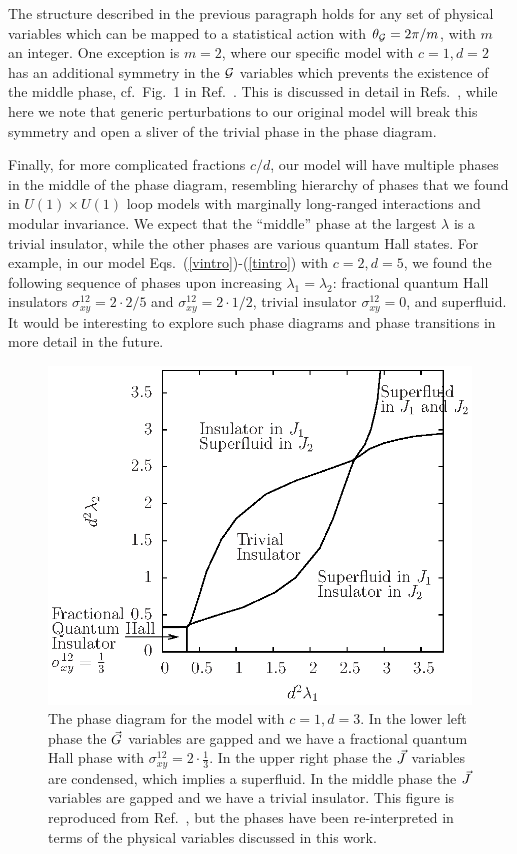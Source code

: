 The structure described in the previous paragraph holds for any set of physical variables which can be mapped to a statistical action with $\theta_{\cal G}=2\pi/m$, with $m$ an integer. %
One exception is $m=2$, where our specific model with $c=1, d=2$ has an additional symmetry in the ${\cal G}$ variables which prevents the existence of the middle phase, cf.~Fig.~1 in Ref.~\cite{Loopy}.  This is discussed in detail in Refs.~\cite{Loopy, Gen2Loops}, while here we note that generic perturbations to our original model will break this symmetry and open a sliver of the trivial phase in the phase diagram.

Finally, for more complicated fractions $c/d$, our model will have multiple phases in the middle of the phase diagram, resembling hierarchy of phases that we found in $U(1) \times U(1)$ loop models with marginally long-ranged interactions and modular invariance.\cite{Gen2Loops}  We expect that the ``middle'' phase at the largest $\lambda$ is a trivial insulator, while the other phases are various quantum Hall states.  For example, in our model Eqs.~(\ref{vintro})-(\ref{tintro}) with $c=2, d=5$, we found the following sequence of phases upon increasing $\lambda_1 = \lambda_2$: fractional quantum Hall insulators $\sigma^{12}_{xy} = 2\cdot 2/5$ and $\sigma^{12}_{xy} = 2\cdot 1/2$, trivial insulator $\sigma^{12}_{xy} = 0$, and superfluid.  It would be interesting to explore such phase diagrams and phase transitions in more detail in the future.

\begin{figure}
\includegraphics[width=\linewidth]{figures/fracphase.eps}
\caption{The phase diagram for the model with $c=1,d=3$. In the lower left phase the $\vec{G}$ variables are gapped and we have a fractional quantum Hall phase with $\sigma^{12}_{xy}=2\cdot\frac{1}{3}$. In the upper right phase the $\vec{J}$ variables are condensed, which implies a superfluid. In the middle phase the $\vec{J}$ variables are gapped and we have a trivial insulator. This figure is reproduced from Ref.~\cite{short_range3}, but the phases have been re-interpreted in terms of the physical variables discussed in this work.}
\label{fracphase}
\end{figure}


